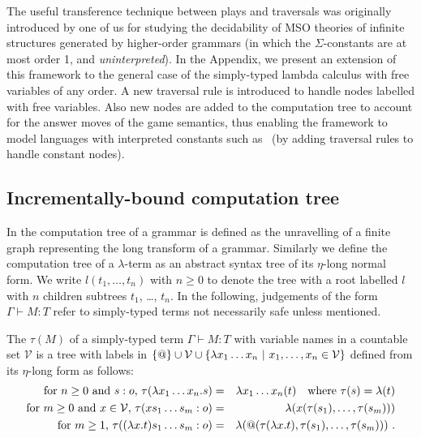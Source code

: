 The useful transference technique between plays and traversals was
originally introduced by one of us \cite{OngLics2006} for studying the
decidability of MSO theories of infinite structures generated by
higher-order grammars (in which the $\Sigma$-constants are at most
order 1, and \emph{uninterpreted}).
In the Appendix, we present an extension of this framework to the
general case of the simply-typed lambda calculus with free variables
of any order. A new traversal rule is introduced to handle nodes
labelled with free variables. Also new nodes are added to the
computation tree to account for the answer moves of the game
semantics, thus enabling the framework to model languages with
interpreted constants such as \pcf~(by adding traversal rules to
handle constant nodes).

\subsection*{Incrementally-bound computation tree}
In \cite{OngLics2006} the computation tree of a grammar is defined as
the unravelling of a finite graph representing the long transform of a
grammar. Similarly we define the computation tree of a $\lambda$-term
as an abstract syntax tree of its $\eta$-long normal form.  We write
$l(t_1, \ldots, t_n)$ with $n \geq 0$ to denote the tree with a root labelled $l$ with $n$ children subtrees $t_1$, \ldots, $t_n$.
In the following, judgements of the form $\Gamma \vdash M:T$
refer to simply-typed terms not necessarily safe unless  mentioned.

\begin{definition}\rm
\label{dfn:comptree}
  The  $\tau(M)$ of a simply-typed term
  $\Gamma \vdash M:T$ with variable names in a countable set
  $\mathcal{V}$ is a tree with labels in $ \{ @ \} \cup \mathcal{V}
  \cup \{ \lambda x_1 \ldots x_n \ | \ x_1 ,\ldots, x_n \in
  \mathcal{V} \}$ defined from its $\eta$-long form as follows:
\begin{eqnarray*}
  \mbox{for $n\geq 0$ and $s:o$, } \tau(\lambda x_1 \ldots x_n . s) &=& \lambda x_1 \ldots x_n(t) \mbox{\quad where $\tau(s) = \lambda(t)$}\\
  \mbox{for $m\geq 0$ and $x \in  \mathcal{V}$, } \tau( x s_1 \ldots s_m : o) &=&  \lambda (x(\tau(s_1),\ldots,\tau(s_m)))\\
  \mbox{for $m \geq 1$, } \tau((\lambda x.t) s_1 \ldots s_m :o) &=& \lambda (@(\tau(\lambda x.t),\tau(s_1),\ldots,\tau(s_m))) \ .
\end{eqnarray*}
\end{definition}

